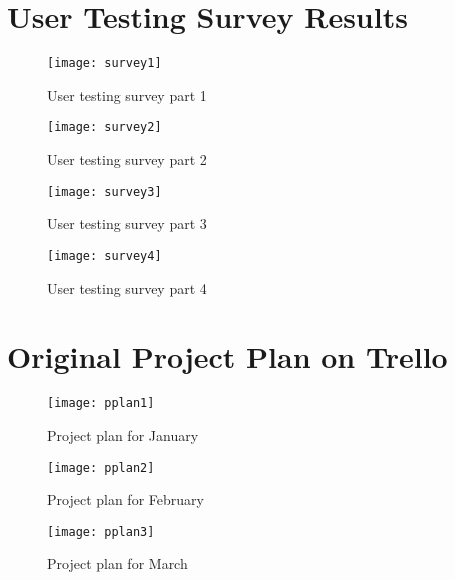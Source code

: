 \chapter{User Testing Survey Results}
\label{appendix:survey}
\begin{figure}[h]
	\centering
	\texttt{[image: survey1]}
	\caption*{User testing survey part 1}
	\label{fig:survey1}
\end{figure}
\begin{figure}[h]
	\centering
	\texttt{[image: survey2]}
	\caption*{User testing survey part 2}
	\label{fig:survey2}
\end{figure}
\begin{figure}[h]
	\centering
	\texttt{[image: survey3]}
	\caption*{User testing survey part 3}
	\label{fig:survey3}
\end{figure}
\begin{figure}[h]
	\centering
	\texttt{[image: survey4]}
	\caption*{User testing survey part 4}
	\label{fig:survey4}
\end{figure}

\chapter{Original Project Plan on Trello}
\label{appendix:plan}
\begin{figure}[h]
	\centering
	\texttt{[image: pplan1]}
	\caption*{Project plan for January}
	\label{fig:pplan1}
\end{figure}
\begin{figure}[h]
	\centering
	\texttt{[image: pplan2]}
	\caption*{Project plan for February}
	\label{fig:pplan2}
\end{figure}
\begin{figure}[h]
	\centering
	\texttt{[image: pplan3]}
	\caption*{Project plan for March}
	\label{fig:pplan3}
\end{figure}